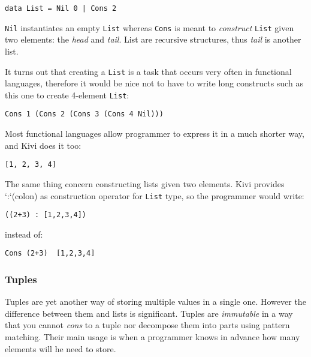 \documentclass[12pt,a4paper]{report}
\begin{document}
\hspace*{-1.5in}
\begin{lstlisting}[style=haskell]
data List = Nil 0 | Cons 2
\end{lstlisting}

\texttt{Nil} instantiates an empty \texttt{List} whereas \texttt{Cons} is meant
to \textit{construct} \texttt{List} given two elements: the \textit{head} and
\textit{tail}. List are recursive structures, thus \textit{tail} is another
list.

It turns out that creating a \texttt{List} is a task that occurs very often in
functional languages, therefore it would be nice not to have to write long
constructs such as this one to create 4-element \texttt{List}:

\hspace*{-1.5in}
\begin{lstlisting}[style=haskell]
Cons 1 (Cons 2 (Cons 3 (Cons 4 Nil)))
\end{lstlisting}

Most functional languages allow programmer to express it in a much shorter way,
and Kivi does it too:

\hspace*{-1.5in}
\begin{lstlisting}[style=haskell]
[1, 2, 3, 4]
\end{lstlisting}

The same thing concern constructing lists given two elements. Kivi provides
`:`(colon) as construction operator for \texttt{List} type, so the programmer
would write:

\hspace*{-1.5in}
\begin{lstlisting}[style=haskell]
((2+3) : [1,2,3,4])
\end{lstlisting}
instead of:

\hspace*{-1.5in}
\begin{lstlisting}[style=haskell]
Cons (2+3)  [1,2,3,4]
\end{lstlisting}

\subsubsection{Tuples}
Tuples are yet another way of storing multiple values in a single one. However
the difference between them and lists is significant. Tuples are
\textit{immutable} in a way that you cannot \textit{cons} to a tuple nor
decompose them into parts using pattern matching. Their main usage is when a
programmer knows in advance how many elements will he need to store.
\end{document}
